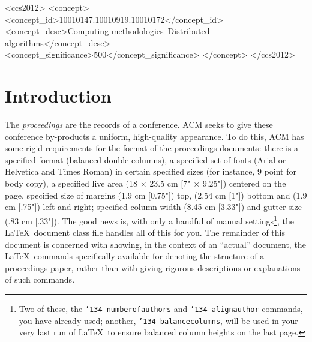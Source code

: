 \documentclass{sig-alternate-05-2015}
\begin{document}
\begin{CCSXML}
<ccs2012>
	<concept>
		<concept_id>10010147.10010919.10010172</concept_id>
		<concept_desc>Computing methodologies~Distributed algorithms</concept_desc>
		<concept_significance>500</concept_significance>
	</concept>
</ccs2012> 
\end{CCSXML}

\printccsdesc


\section{Introduction}
The \textit{proceedings} are the records of a conference. ACM seeks to give these conference by-products a uniform, high-quality appearance.  To do this, ACM has some rigid requirements for the format of the proceedings documents: there is a specified format (balanced  double columns), a specified set of fonts (Arial or Helvetica and Times Roman) in certain specified sizes (for instance, 9 point for body copy), a specified live area (18 $\times$ 23.5 cm [7" $\times$ 9.25"]) centered on the page, specified size of margins (1.9 cm [0.75"]) top, (2.54 cm [1"]) bottom and (1.9 cm [.75"]) left and right; specified column width (8.45 cm [3.33"]) and gutter size (.83 cm [.33"]). The good news is, with only a handful of manual settings\footnote{Two of these, the {\texttt{\char'134 numberofauthors}} and {\texttt{\char'134 alignauthor}} commands, you have already used; another, {\texttt{\char'134 balancecolumns}}, will be used in your very last run of \LaTeX\ to ensure balanced column heights on the last page.}, the \LaTeX\ document class file handles all of this for you. 
The remainder of this document is concerned with showing, in the context of an ``actual'' document, the \LaTeX\ commands specifically available for denoting the structure of a proceedings paper, rather than with giving rigorous descriptions or explanations of such commands. 
\end{document}
